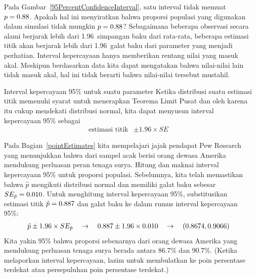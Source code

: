 \begin{examplewrap}
\begin{nexample}{Pada Gambar~\ref{95PercentConfidenceInterval},
satu interval tidak memuat $p = 0.88{}$.
Apakah hal ini menyiratkan bahwa proporsi populasi yang digunakan
dalam simulasi tidak mungkin
$p = 0.88{}$?}
Sebagaimana beberapa observasi secara alami
berjarak lebih dari 1.96~simpangan baku
dari rata-rata, beberapa estimasi titik akan berjarak lebih dari
1.96~galat baku dari parameter yang menjadi perhatian.
Interval kepercayaan hanya memberikan rentang nilai
yang masuk akal.
Meskipun berdasarkan data kita dapat mengatakan bahwa nilai-nilai lain tidak masuk akal,
hal ini tidak berarti bahwa nilai-nilai tersebut mustahil.
\end{nexample}
\end{examplewrap}

\begin{onebox}{Interval kepercayaan 95\% untuk suatu parameter}
  Ketika distribusi suatu estimasi titik memenuhi syarat untuk
  menerapkan Teorema Limit Pusat dan
  oleh karena itu cukup mendekati distribusi normal,
  kita dapat menyusun interval kepercayaan 95\% sebagai
  \begin{align*}
  \text{estimasi titik} &\pm 1.96 \times SE
  \end{align*}
\end{onebox}

\begin{examplewrap}
\begin{nexample}{Pada Bagian~\ref{pointEstimates} kita mempelajari
    jajak pendapat Pew Research yang menunjukkan bahwa
    \pewsolarpollpercent{} dari sampel acak berisi
    \pewsolarpollsize{} orang dewasa Amerika
    mendukung perluasan peran tenaga surya.
    Hitung dan
    maknai interval kepercayaan 95\% untuk proporsi
    populasi.} \label{95p_ci_for_pew_solar_support}
  Sebelumnya, kita telah memastikan bahwa $\hat{p}$ mengikuti distribusi
  normal dan memiliki galat baku sebesar
  $SE_{\hat{p}} = 0.010{}$.
  Untuk menghitung interval kepercayaan 95\%, substitusikan
  estimasi titik $\hat{p} = 0.887{}$ dan
  galat baku ke dalam rumus interval kepercayaan 95\%:
  \begin{align*}
  \hat{p} \pm 1.96 \times SE_{\hat{p}}
  \quad\to\quad
  0.887{} \pm 1.96 \times 0.010{}
  \quad\to\quad
  (0.8674, 0.9066)
  \end{align*}
  Kita yakin 95\% bahwa proporsi sebenarnya dari
  orang dewasa Amerika yang mendukung perluasan tenaga surya berada
  antara 86.7\% dan 90.7\%.
  (Ketika melaporkan interval kepercayaan, lazim untuk membulatkan
  ke poin persentase terdekat atau persepuluhan
  poin persentase terdekat.)
\end{nexample}
\end{examplewrap}



